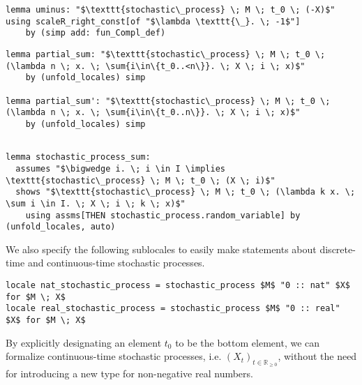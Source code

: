 \begin{isalemma}
{\small
\begin{lstlisting}[style=isabelle]
lemma uminus: "$\texttt{stochastic\_process} \; M \; t_0 \; (-X)$" using scaleR_right_const[of "$\lambda \texttt{\_}. \; -1$"] 
	by (simp add: fun_Compl_def)
\end{lstlisting}
}
\end{isalemma}

\begin{isalemma}
{\small
\begin{lstlisting}[style=isabelle]
lemma partial_sum: "$\texttt{stochastic\_process} \; M \; t_0 \; (\lambda n \; x. \; \sum{i\in\{t_0..<n\}}. \; X \; i \; x)$" 
	by (unfold_locales) simp

lemma partial_sum': "$\texttt{stochastic\_process} \; M \; t_0 \; (\lambda n \; x. \; \sum{i\in\{t_0..n\}}. \; X \; i \; x)$" 
	by (unfold_locales) simp
\end{lstlisting}
}
\end{isalemma}

\begin{isalemma}
{\small
\begin{lstlisting}[style=isabelle]

lemma stochastic_process_sum:
  assumes "$\bigwedge i. \; i \in I \implies \texttt{stochastic\_process} \; M \; t_0 \; (X \; i)$"
  shows "$\texttt{stochastic\_process} \; M \; t_0 \; (\lambda k x. \; \sum i \in I. \; X \; i \; k \; x)$" 
    using assms[THEN stochastic_process.random_variable] by (unfold_locales, auto)

\end{lstlisting}
}
\end{isalemma}

We also specify the following sublocales to easily make statements about discrete-time and continuous-time stochastic processes.

\begin{isadefinition}
{\small
\begin{lstlisting}[style=isabelle]
locale nat_stochastic_process = stochastic_process $M$ "0 :: nat" $X$ for $M \; X$
locale real_stochastic_process = stochastic_process $M$ "0 :: real" $X$ for $M \; X$
\end{lstlisting}
}
\end{isadefinition}

By explicitly designating an element $t_0$ to be the bottom element, we can formalize continuous-time stochastic processes, i.e. $(X_t)_{t \in \mathbb{R}_{\ge 0}}$, without the need for introducing a new type for non-negative real numbers. 

